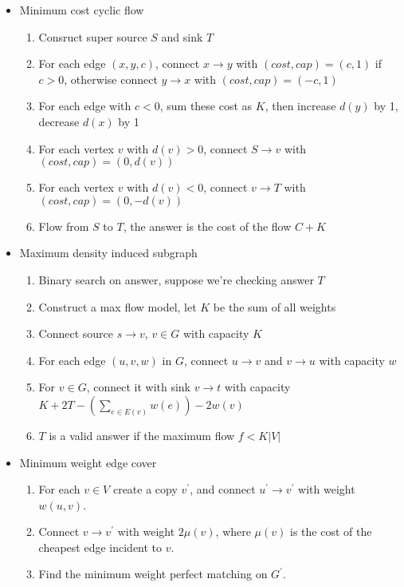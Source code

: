 \begin{itemize}
\begin{enumerate}
    \end{enumerate}
    \item Minimum cost cyclic flow
    \begin{enumerate}
        \item Consruct super source $S$ and sink $T$
        \item For each edge $(x, y, c)$, connect $x \rightarrow y$ with $(cost, cap) = (c, 1)$ if $c > 0$, otherwise connect $y \rightarrow x$ with $(cost, cap) = (-c, 1)$
        \item For each edge with $c < 0$, sum these cost as $K$, then increase $d(y)$ by 1, decrease $d(x)$ by 1
        \item For each vertex $v$ with $d(v) > 0$, connect $S \rightarrow v$ with $(cost, cap) = (0, d(v))$
        \item For each vertex $v$ with $d(v) < 0$, connect $v \rightarrow T$ with $(cost, cap) = (0, -d(v))$
        \item Flow from $S$ to $T$, the answer is the cost of the flow $C + K$
    \end{enumerate}
    \item Maximum density induced subgraph
    \begin{enumerate}
        \item Binary search on answer, suppose we're checking answer $T$
        \item Construct a max flow model, let $K$ be the sum of all weights
        \item Connect source $s \rightarrow v$, $v \in G$ with capacity $K$
        \item For each edge $(u, v, w)$ in $G$, connect $u \rightarrow v$ and $v \rightarrow u$ with capacity $w$
        \item For $v \in G$, connect it with sink $v \rightarrow t$ with capacity $K + 2T - (\sum_{e \in E(v)}{w(e)}) - 2w(v)$
        \item $T$ is a valid answer if the maximum flow $f < K \lvert V \rvert$
    \end{enumerate}
    \item Minimum weight edge cover
    \begin{enumerate}
      \item For each $v \in V$ create a copy $v^\prime$, and connect $u^\prime \to v^\prime$ with weight $w(u, v)$.
      \item Connect $v \to v^\prime$ with weight $2\mu(v)$, where $\mu(v)$ is the cost of the cheapest edge incident to $v$.
      \item Find the minimum weight perfect matching on $G^\prime$.
    \end{enumerate}
    


\end{itemize}
